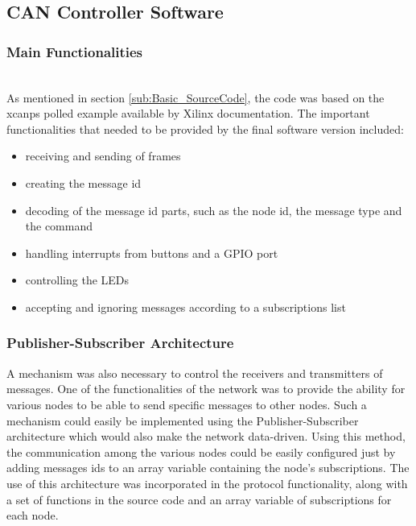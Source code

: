 
\subsection{CAN Controller Software}
\subsubsection{Main Functionalities}~\\
As mentioned in section \ref{sub:Basic_SourceCode}, the code was based on the xcanps polled example available by Xilinx documentation.
The important functionalities that needed to be provided by the final software version included:
\begin{itemize}
\item receiving and sending of frames
\item creating the message id
\item decoding of the message id parts, such as the node id, the message type and the command
\item handling interrupts from buttons and a GPIO port
\item controlling the LEDs
\item accepting and ignoring messages according to a subscriptions list
\end{itemize}

\subsubsection{Publisher-Subscriber Architecture}
A mechanism was also necessary to control the receivers and transmitters of messages.
One of the functionalities of the network was to provide the ability for various nodes to be able to send specific messages to other nodes.
Such a mechanism could easily be implemented using the Publisher-Subscriber architecture which would also make the network data-driven.
Using this method, the communication among the various nodes could be easily configured just by adding messages ids to an array variable containing the node's subscriptions.
The use of this architecture was incorporated in the protocol functionality, along with a set of functions in the source code and an array variable of subscriptions for each node.

